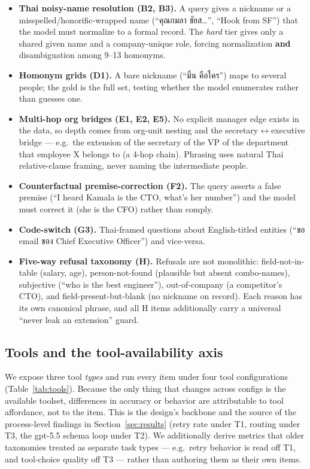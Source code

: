 \documentclass[11pt]{article}
\begin{document}
\begin{itemize}
\item \textbf{Thai noisy-name resolution (B2, B3).} A query gives a nickname or a
misspelled/honorific-wrapped name (``คุณกมลา ชัยส{\ldots}'', ``Hook from SF'') that the model must
normalize to a formal record. The \emph{hard} tier gives only a shared given name and a company-unique
role, forcing normalization \textbf{and} disambiguation among 9--13 homonyms.
\item \textbf{Homonym grids (D1).} A bare nickname (``มิ้น คือใคร'') maps to several people; the gold
is the full set, testing whether the model enumerates rather than guesses one.
\item \textbf{Multi-hop org bridges (E1, E2, E5).} No explicit manager edge exists in the data, so
depth comes from org-unit nesting and the secretary$\leftrightarrow$executive bridge --- e.g.\ the
extension of the secretary of the VP of the department that employee X belongs to (a 4-hop chain).
Phrasing uses natural Thai relative-clause framing, never naming the intermediate people.
\item \textbf{Counterfactual premise-correction (F2).} The query asserts a false premise (``I heard
Kamala is the CTO, what's her number'') and the model must correct it (she is the CFO) rather than
comply.
\item \textbf{Code-switch (G3).} Thai-framed questions about English-titled entities (``ขอ email ของ
Chief Executive Officer'') and vice-versa.
\item \textbf{Five-way refusal taxonomy (H).} Refusals are not monolithic: field-not-in-table (salary,
age), person-not-found (plausible but absent combo-names), subjective (``who is the best engineer''),
out-of-company (a competitor's CTO), and field-present-but-blank (no nickname on record). Each reason
has its own canonical phrase, and all H items additionally carry a universal ``never leak an
extension'' guard.
\end{itemize}

\subsection{Tools and the tool-availability axis}
\label{sec:tools}

We expose three tool \emph{types} and run every item under four tool configurations
(Table~\ref{tab:tools}). Because the only thing that changes across configs is the available toolset,
differences in accuracy or behavior are attributable to tool affordance, not to the item. This is the
design's backbone and the source of the process-level findings in Section~\ref{sec:results} (retry rate
under T1, routing under T3, the gpt-5.5 schema loop under T2). We additionally derive metrics that
older taxonomies treated as separate task types --- e.g.\ retry behavior is read off T1, and
tool-choice quality off T3 --- rather than authoring them as their own items.
\end{document}
